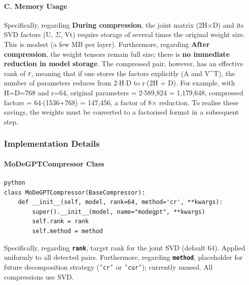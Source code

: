 \paragraph{C. Memory Usage}

Specifically, regarding \textbf{During compression}, the joint matrix (2H$\times$D) and its SVD factors (U, $\Sigma$, Vt) require storage of several times the original weight size. This is modest (a few MB per layer). Furthermore, regarding \textbf{After compression}, the weight tensors remain full size; there is \textbf{no immediate reduction in model storage}. The compressed pair, however, has an effective rank of \texttt{r}, meaning that if one stores the factors explicitly (A and V\textasciicircum{}T), the number of parameters reduces from 2$\cdot$H$\cdot$D to r$\cdot$(2H + D). For example, with H=D=768 and r=64, original parameters = 2$\cdot$589,824 = 1,179,648, compressed factors = 64$\cdot$(1536+768) = 147,456, a factor of 8$\times$ reduction. To realise these savings, the weights must be converted to a factorised format in a subsequent step.



\subsubsection*{Implementation Details}

\paragraph{MoDeGPTCompressor Class}

\vspace{0.5em}
\begin{mdframed}[backgroundcolor=codebg, linecolor=codeframe, linewidth=1pt, roundcorner=4pt, innerleftmargin=2pt, innerrightmargin=5pt, innertopmargin=5pt, innerbottommargin=5pt]
\begin{lstlisting}
python
class MoDeGPTCompressor(BaseCompressor):
    def __init__(self, model, rank=64, method='cr', **kwargs):
        super().__init__(model, name="modegpt", **kwargs)
        self.rank = rank
        self.method = method
\end{lstlisting}
\end{mdframed}
\vspace{0.5em}

Specifically, regarding \textbf{\texttt{rank}}, target rank for the joint SVD (default 64). Applied uniformly to all detected pairs. Furthermore, regarding \textbf{\texttt{method}}, placeholder for future decomposition strategy (\texttt{'cr'} or \texttt{'cur'}); currently unused. All compressions use SVD.


